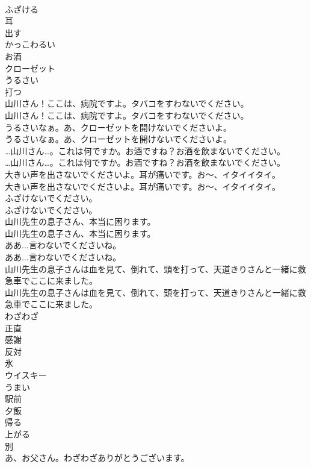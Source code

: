 \documentclass[8pt]{extreport}
\begin{document}
\begin{CJK}{UTF8}{min}
\\	ふざける
\\	耳
\\	出す
\\	かっこわるい
\\	お酒
\\	クローゼット
\\	うるさい
\\	打つ
\\	山川さん！ここは、病院ですよ。タバコをすわないでください。	
\\	山川さん！ここは、病院ですよ。タバコをすわないでください。 
\\	うるさいなぁ。あ、クローゼットを開けないでくださいよ。	
\\	うるさいなぁ。あ、クローゼットを開けないでくださいよ。 
\\	…山川さん…。これは何ですか。お酒ですね？お酒を飲まないでください。	
\\	…山川さん…。これは何ですか。お酒ですね？お酒を飲まないでください。 
\\	大きい声を出さないでくださいよ。耳が痛いです。お～、イタイイタイ。	
\\	大きい声を出さないでくださいよ。耳が痛いです。お～、イタイイタイ。 
\\	ふざけないでください。	
\\	ふざけないでください。 
\\	山川先生の息子さん、本当に困ります。	
\\	山川先生の息子さん、本当に困ります。 
\\	ああ...言わないでくださいね。	
\\	ああ...言わないでくださいね。 
\\	山川先生の息子さんは血を見て、倒れて、頭を打って、天道きりさんと一緒に救急車でここに来ました。	
\\	山川先生の息子さんは血を見て、倒れて、頭を打って、天道きりさんと一緒に救急車でここに来ました。 
\\	わざわざ
\\	正直
\\	感謝
\\	反対
\\	氷
\\	ウイスキー
\\	うまい
\\	駅前
\\	夕飯
\\	帰る
\\	上がる
\\	別
\\	あ、お父さん。わざわざありがとうございます。	

\end{CJK}
\end{document}
